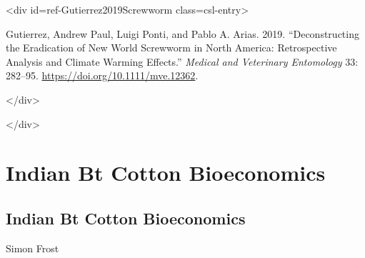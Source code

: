<div id={\textquotedbl}ref-Gutierrez2019Screwworm{\textquotedbl} class={\textquotedbl}csl-entry{\textquotedbl}>



Gutierrez, Andrew Paul, Luigi Ponti, and Pablo A. Arias. 2019. “Deconstructing the Eradication of New World Screwworm in North America: Retrospective Analysis and Climate Warming Effects.” \emph{Medical and Veterinary Entomology} 33: 282–95. \href{https://doi.org/10.1111/mve.12362}{https://doi.org/10.1111/mve.12362}.



</div>



</div>



\chapter{Indian Bt Cotton Bioeconomics}


\section{Indian Bt Cotton Bioeconomics}



\label{1674218157186946496}{}


Simon Frost



